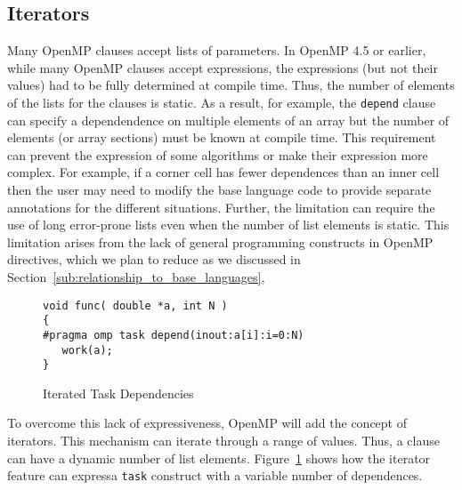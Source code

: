 \subsection{Iterators}
\label{sub:iterators}

Many OpenMP clauses accept lists of parameters. In OpenMP 4.5 or earlier, 
while many OpenMP clauses accept expressions, the expressions (but not 
their values) had to be fully determined at compile time. Thus, the number 
of elements of the lists for the clauses is static. As a result, for example,
the \texttt{depend} clause can specify a dependendence on multiple elements
of an array but the number of elements (or array sections) must be known
at compile time. This requirement can prevent the expression of some
algorithms or make their expression more complex.  For example, if a 
corner cell has fewer dependences than an inner cell then the user may need 
to modify the base language code to provide separate annotations for the
different situations. Further, the limitation can require the use of long 
error-prone lists even when the number of list elements is static. This 
limitation arises from the lack of general programming constructs in 
OpenMP directives, which we plan to reduce as we discussed in 
Section~\ref{sub:relationship_to_base_languages}, 

\begin{figure}
\begin{verbatim}
void func( double *a, int N )
{
#pragma omp task depend(inout:a[i]:i=0:N)
   work(a);
}
\end{verbatim}
\caption{Iterated Task Dependencies}
\label{fig:iterators}
\end{figure}

To overcome this lack of expressiveness, OpenMP will add the concept of  
iterators. This mechanism can iterate through a range of values. Thus, a
clause can have a dynamic number of list elements. Figure~\ref{fig:iterators} 
shows how the iterator feature can expressa \texttt{task} construct with a 
variable number of dependences. 
   


   

